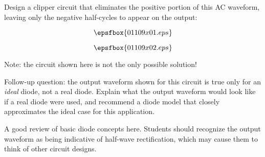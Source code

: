 

Design a clipper circuit that eliminates the positive portion of this AC waveform, leaving only the negative half-cycles to appear on the output:

$$\epsfbox{01109x01.eps}$$







$$\epsfbox{01109x02.eps}$$

\vskip 10pt

Note: the circuit shown here is not the only possible solution!

\vskip 10pt

Follow-up question: the output waveform shown for this circuit is true only for an {\it ideal} diode, not a real diode.  Explain what the output waveform would look like if a real diode were used, and recommend a diode model that closely approximates the ideal case for this application.







A good review of basic diode concepts here.  Students should recognize the output waveform as being indicative of half-wave rectification, which may cause them to think of other circuit designs.




